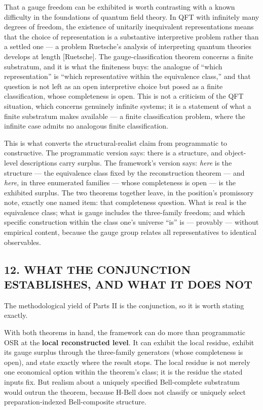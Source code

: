 \documentclass[
]{article}
\begin{document}
That a gauge freedom can be exhibited is worth contrasting with a known
difficulty in the foundations of quantum field theory. In QFT with
infinitely many degrees of freedom, the existence of unitarily
inequivalent representations means that the choice of representation is
a substantive interpretive problem rather than a settled one --- a
problem Ruetsche's analysis of interpreting quantum theories develops at
length {[}Ruetsche{]}. The gauge-classification theorem concerns a
finite substratum, and it is what the finiteness buys: the analogue of
``which representation'' is ``which representative within the
equivalence class,'' and that question is not left as an open
interpretive choice but posed as a finite classification, whose
completeness is open. This is not a criticism of the QFT situation,
which concerns genuinely infinite systems; it is a statement of what a
finite substratum makes available --- a finite classification problem,
where the infinite case admits no analogous finite classification.

This is what converts the structural-realist claim from programmatic to
constructive. The programmatic version says: there is a structure, and
object-level descriptions carry surplus. The framework's version says:
\emph{here} is the structure --- the equivalence class fixed by the
reconstruction theorem --- and \emph{here}, in three enumerated families
--- whose completeness is open --- is the exhibited surplus. The two
theorems together leave, in the position's promissory note, exactly one
named item: that completeness question. What is real is the equivalence
class; what is gauge includes the three-family freedom; and which
specific construction within the class one's universe ``is'' is ---
provably --- without empirical content, because the gauge group relates
all representatives to identical observables.

\hypertarget{what-the-conjunction-establishes-and-what-it-does-not}{%
\subsection{12. WHAT THE CONJUNCTION ESTABLISHES, AND WHAT IT DOES
NOT}\label{what-the-conjunction-establishes-and-what-it-does-not}}

The methodological yield of Parts II is the conjunction, so it is worth
stating exactly.

With both theorems in hand, the framework can do more than programmatic
OSR at the \textbf{local reconstructed level}. It can exhibit the local
residue, exhibit its gauge surplus through the three-family generators
(whose completeness is open), and state exactly where the result stops.
The local residue is not merely one economical option within the
theorem's class; it is the residue the stated inputs fix. But realism
about a uniquely specified Bell-complete substratum would outrun the
theorem, because H-Bell does not classify or uniquely select
preparation-indexed Bell-composite structure.
\end{document}
